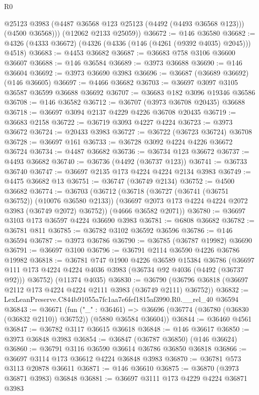 \begin{lexlean}{R0}
\begin{coremodule}
          @25123
          @3983
          (@4487 @36568 @123 @25123 (@4492 (@4493 @36568 @123)))
          (@4500 @36568)))
      (@12062 @2133 @25059))
@36672 := @146 @36580
@36682 := @4326 (@4333 @36672) (@4326 (@4336 (@146 (@4261 (@9392 @4035) @2045))) @4518)
@36683 := @4453 @36682
@36687 := @36683 @758 @3106 @36600 @36607
@36688 := @146 @36584
@36689 := @3973 @36688
@36690 := @146 @36604
@36692 := @3973 @36690 @3983
@36696 := @36687 (@36689 @36692) (@146 @36605)
@36697 := @4466 @36682
@36703 := @36697 @3097 @3105 @36587 @36599 @36688 @36692
@36707 := @36683 @182 @3096 @19346 @36586
@36708 := @146 @36582
@36712 := @36707 (@3973 @36708 @20435) @36688
@36718 := @36697 @3094 @2137 @4229 @4226 @36708 @20435
@36719 := @36683 @2158
@36722 := @36719 @3093 @4227 @4224
@36723 := @3973 @36672
@36724 := @20433 @3983
@36727 := @36722 (@36723 @36724) @36708
@36728 := @36697 @161
@36733 := @36728 @3092 @4224 @4226 @36672 @36724
@36734 := @4487 @36682
@36736 := @36734 @123 @36672
@36737 := @4493 @36682
@36740 := @36736 (@4492 (@36737 @123))
@36741 := @36733 @36740
@36747 := @36697 @2135 @173 @4224 @4224 @2134 @3983
@36749 := @4475 @36682 @13
@36751 := @36747 (@36749 @2134)
@36752 := @4500 @36682
@36774 := @36703
    (@36712
      (@36718
        (@36727 (@36741 (@36751 @36752)) (@10076 @36580 @2133))
        (@36697 @2073 @173 @4224 @4224 @2072 @3983 (@36749 @2072) @36752))
      (@4666 @36582 @2071))
@36780 := @36697 @3103 @173 @36597 @4224 @36690 @3983
@36781 := @6808 @36682
@36782 := @36781 @811
@36785 := @36782 @3102 @36592 @36596
@36786 := @146 @36594
@36787 := @3973 @36786
@36790 := @36785 (@36787 @19982) @36690
@36791 := @36697 @3100
@36796 := @36791 @2114 @36590 @4226 @36786 @19982
@36818 := @36781
    @747
    @1900
    @4226
    @36589
    @15384
    @36786
    (@36697 @111 @173 @4224 @4224 @4036 @3983 (@36734 @92 @4036 (@4492 (@36737 @92))) @36752)
    (@11374 @4035)
@36830 := @36790 (@36796 @36818 (@36697 @2112 @173 @4224 @4224 @2111 @3983 (@36749 @2111) @36752))
@36832 := LexLeanPreserve.C844b91055a7fc1aa7e6fef1815af3990.R0.__rel_40 @36594
@36843 := @36671
    (fun ("_" : @36461) =>
    @36696 (@36774 (@36780 (@36830 (@36832 @2110)) @36752)) (@5880 @36584 @36604))
@36844 := @36460 @4561
@36847 := @36782 @3117 @36615 @36618
@36848 := @146 @36617
@36850 := @3973 @36848 @3983
@36854 := @36847 (@36787 @36850) (@146 @36624)
@36860 := @36791 @3116 @36590 @36614 @36786 @36850 @36818
@36866 := @36697 @3114 @173 @36612 @4224 @36848 @3983
@36870 := @36781 @573 @3113 @20878 @36611
@36871 := @146 @36610
@36875 := @36870 (@3973 @36871 @3983) @36848
@36881 := @36697 @3111 @173 @4229 @4224 @36871 @3983

\end{coremodule}
\end{lexlean}
